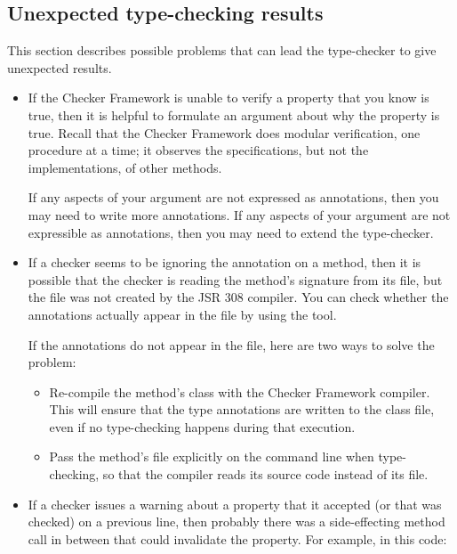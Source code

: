 \subsection{Unexpected type-checking results\label{common-problems-typechecking}}

This section describes possible problems that can lead the type-checker to
give unexpected results.


\begin{itemize}
\item
  If the Checker Framework is unable to verify a property that you know is
  true, then it is helpful to formulate an argument about why the property
  is true.  Recall that the Checker Framework does modular verification,
  one procedure at a time; it observes the specifications, but not the
  implementations, of other methods.

  If any aspects of your argument are not expressed as annotations, then
  you may need to write more annotations.  If any aspects of your argument
  are not expressible as annotations, then you may need to extend the
  type-checker.

\item
If a checker seems to be ignoring the annotation on a method, then it is
possible that the checker is reading the method's signature from its
 file, but the  file was not created by the JSR
308 compiler.  You can check whether the annotations actually appear in the
 file by using the  tool.

If the annotations do not appear in the  file, here are two
ways to solve the problem:
\begin{itemize}
\item
  Re-compile the method's class with the Checker Framework compiler.  This will
  ensure that the type annotations are written to the class file, even if
  no type-checking happens during that execution.
\item
  Pass the method's file explicitly on the command line when type-checking,
  so that the compiler reads its source code instead of its 
  file.
\end{itemize}

\item
If a checker issues a warning about a property that it accepted (or that
was checked) on a previous line, then probably there was a side-effecting
method call in between that could invalidate the property.  For example, in
this code:


\end{itemize}
